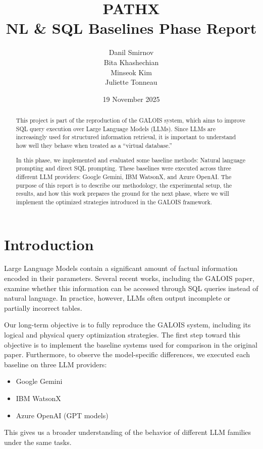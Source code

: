 \documentclass[12pt]{article}
\title{PATHX \\ \large NL \& SQL Baselines Phase Report}
\author{
    Danil Smirnov \\
    Bita Khashechian \\
    Minseok Kim \\
    Juliette Tonneau
}
\date{19 November 2025}
\begin{document}
\maketitle

\begin{abstract}
This project is part of the reproduction of the GALOIS system, which aims to improve SQL query execution over Large Language Models (LLMs). Since LLMs are increasingly used for structured information retrieval, it is important to understand how well they behave when treated as a ``virtual database.''

In this phase, we implemented and evaluated some baseline methods: Natural language prompting and direct SQL prompting. These baselines were executed across three different LLM providers: Google Gemini, IBM WatsonX, and Azure OpenAI. The purpose of this report is to describe our methodology, the experimental setup, the results, and how this work prepares the ground for the next phase, where we will implement the optimized strategies introduced in the GALOIS framework.
\end{abstract}

\section{Introduction}

Large Language Models contain a significant amount of factual information encoded in their parameters. Several recent works, including the GALOIS paper, examine whether this information can be accessed through SQL queries instead of natural language. In practice, however, LLMs often output incomplete or partially incorrect tables.

Our long-term objective is to fully reproduce the GALOIS system, including its logical and physical query optimization strategies. The first step toward this objective is to implement the baseline systems used for comparison in the original paper. Furthermore, to observe the model-specific differences, we executed each baseline on three LLM providers:

\begin{itemize}
    \item Google Gemini
    \item IBM WatsonX
    \item Azure OpenAI (GPT models)
\end{itemize}

This gives us a broader understanding of the behavior of different LLM families under the same tasks.
\end{document}
